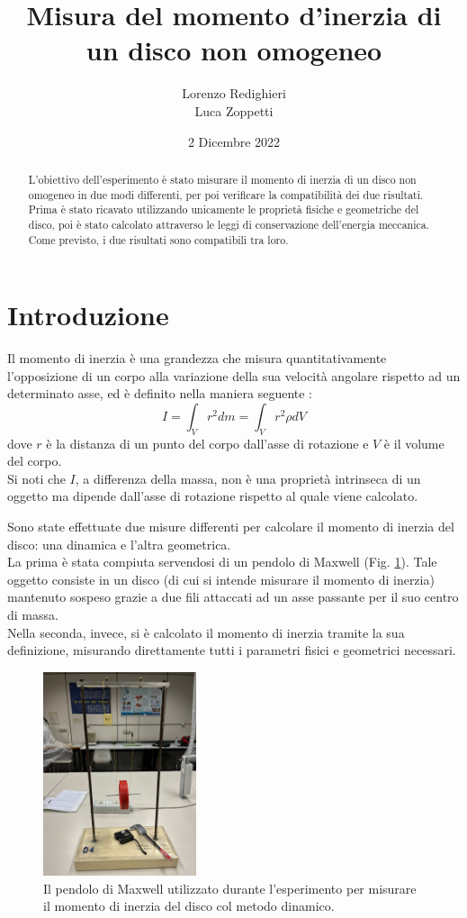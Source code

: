 \documentclass{article}
\title{Misura del momento d’inerzia di un disco non omogeneo}
\author{Lorenzo Redighieri\\Luca Zoppetti}
\date{2 Dicembre 2022}
\begin{document}
\maketitle

\begin{abstract}
L'obiettivo dell'esperimento è stato misurare il momento di inerzia di un disco non omogeneo in due modi differenti, per poi verificare la compatibilità dei due risultati. Prima è stato ricavato utilizzando unicamente le proprietà fisiche e geometriche del disco, poi è stato calcolato attraverso le leggi di conservazione dell'energia meccanica. Come previsto, i due risultati sono compatibili tra loro.
\end{abstract}

\newpage

\section{Introduzione}
Il momento di inerzia è una grandezza che misura quantitativamente l'opposizione di un corpo alla variazione della sua velocità angolare rispetto ad un determinato asse, ed è definito nella maniera seguente \cite{focardi:inerzia}:
$$ I = \int_V r ^ 2 dm = \int_V r ^ 2 \rho dV $$
dove $ r $ è la distanza di un punto del corpo dall'asse di rotazione e $ V $ è il volume del corpo. \\
Si noti che $ I $, a differenza della massa, non è una proprietà intrinseca di un oggetto ma dipende dall'asse di rotazione rispetto al quale viene calcolato.
\par Sono state effettuate due misure differenti per calcolare il momento di inerzia del disco: una dinamica e l'altra geometrica.\\
La prima è stata compiuta servendosi di un pendolo di Maxwell (Fig. \ref{maxwell}). Tale oggetto consiste in un disco (di cui si intende misurare il momento di inerzia) mantenuto sospeso grazie a due fili attaccati ad un asse passante per il suo centro di massa.\\
Nella seconda, invece, si è calcolato il momento di inerzia tramite la sua definizione, misurando direttamente tutti i parametri fisici e geometrici necessari.

\begin{figure}[ht!]
\centering
\includegraphics[width=0.4\textwidth]{images/maxwell.jpg}
\caption{Il pendolo di Maxwell utilizzato durante l'esperimento per misurare il momento di inerzia del disco col metodo dinamico.}
\label{maxwell}
\end{figure}
\end{document}
